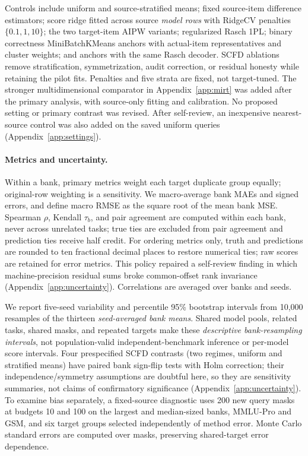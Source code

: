 \documentclass{article}
\begin{document}
Controls include uniform and source-stratified means; fixed source-item difference estimators; score ridge fitted across source \emph{model rows} with RidgeCV penalties $\{0.1,1,10\}$; the two target-item AIPW variants; regularized Rasch 1PL; binary correctness MiniBatchKMeans anchors with actual-item representatives and cluster weights; and anchors with the same Rasch decoder. SCFD ablations remove stratification, symmetrization, audit correction, or residual honesty while retaining the pilot fits. Penalties and five strata are fixed, not target-tuned. The stronger multidimensional comparator in Appendix~\ref{app:mirt} was added after the primary analysis, with source-only fitting and calibration. No proposed setting or primary contrast was revised. After self-review, an inexpensive nearest-source control was also added on the saved uniform queries (Appendix~\ref{app:settings}).

\paragraph{Metrics and uncertainty.}
Within a bank, primary metrics weight each target duplicate group equally; original-row weighting is a sensitivity. We macro-average bank MAEs and signed errors, and define macro RMSE as the square root of the mean bank MSE. Spearman $\rho$, Kendall $\tau_b$, and pair agreement are computed within each bank, never across unrelated tasks; true ties are excluded from pair agreement and prediction ties receive half credit. For ordering metrics only, truth and predictions are rounded to ten fractional decimal places to restore numerical ties; raw scores are retained for error metrics. This policy repaired a self-review finding in which machine-precision residual sums broke common-offset rank invariance (Appendix~\ref{app:uncertainty}). Correlations are averaged over banks and seeds.

We report five-seed variability and percentile 95\% bootstrap intervals from 10,000 resamples of the thirteen \emph{seed-averaged bank means}. Shared model pools, related tasks, shared masks, and repeated targets make these \emph{descriptive bank-resampling intervals}, not population-valid independent-benchmark inference or per-model score intervals. Four prespecified SCFD contrasts (two regimes, uniform and stratified means) have paired bank sign-flip tests with Holm correction; their independence/symmetry assumptions are doubtful here, so they are sensitivity summaries, not claims of confirmatory significance (Appendix~\ref{app:uncertainty}). To examine bias separately, a fixed-source diagnostic uses 200 new query masks at budgets 10 and 100 on the largest and median-sized banks, MMLU-Pro and GSM, and six target groups selected independently of method error. Monte Carlo standard errors are computed over masks, preserving shared-target error dependence.
\end{document}
